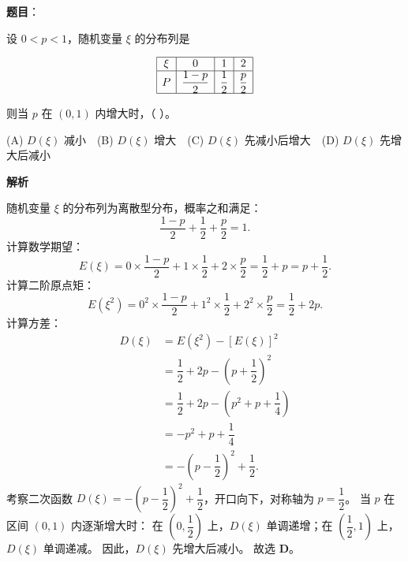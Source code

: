\begin{answer}

\textbf{题目}：

设 $0 < p < 1$，随机变量 $\xi$ 的分布列是

\nopagebreak[4]
\[\begin{array}{|c|c|c|c|}
\hline
\xi & 0 & 1 & 2 \\
\hline
P & \dfrac{1-p}{2} & \dfrac12 & \dfrac{p}{2} \\
\hline
\end{array}\]

则当 $p$ 在 $(0, 1)$ 内增大时，（ ）。

(A) $D(\xi)$ 减小　(B) $D(\xi)$ 增大　(C) $D(\xi)$ 先减小后增大　(D) $D(\xi)$ 先增大后减小

\textbf{解析}

随机变量 $\xi$ 的分布列为离散型分布，概率之和满足：
\nopagebreak[4]
\[\dfrac{1-p}{2} + \dfrac12 + \dfrac{p}{2} = 1.\]
计算数学期望：
\nopagebreak[4]
\[E(\xi) = 0 \times \dfrac{1-p}{2} + 1 \times \dfrac12 + 2 \times \dfrac{p}{2} = \dfrac12 + p = p + \dfrac12.\]
计算二阶原点矩：
\nopagebreak[4]
\[E(\xi^2) = 0^2 \times \dfrac{1-p}{2} + 1^2 \times \dfrac12 + 2^2 \times \dfrac{p}{2} = \dfrac12 + 2p.\]
计算方差：
\nopagebreak[4]
\[\begin{aligned}
D(\xi) &= E(\xi^2) - [E(\xi)]^2 \\
&= \dfrac12 + 2p - \left(p + \dfrac12\right)^2 \\
&= \dfrac12 + 2p - \left(p^2 + p + \dfrac14\right) \\
&= -p^2 + p + \dfrac14 \\
&= -\left(p - \dfrac12\right)^2 + \dfrac12.
\end{aligned}\]
考察二次函数 $D(\xi) = -\left(p - \dfrac12\right)^2 + \dfrac12$，开口向下，对称轴为 $p = \dfrac12$。
当 $p$ 在区间 $(0, 1)$ 内逐渐增大时：
在 $\left(0, \dfrac12\right)$ 上，$D(\xi)$ 单调递增；在 $\left(\dfrac12, 1\right)$ 上，$D(\xi)$ 单调递减。
因此，$D(\xi)$ 先增大后减小。
故选 \textbf{D}。


\end{answer}
